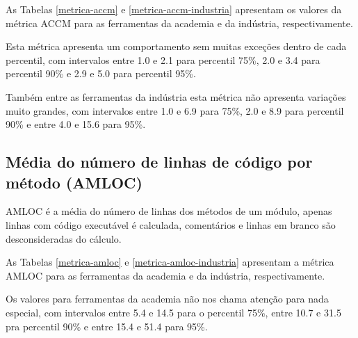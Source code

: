 As Tabelas \ref{metrica-accm} e \ref{metrica-accm-industria} apresentam os
valores da métrica ACCM para as ferramentas da academia e da indústria,
respectivamente.


Esta métrica apresenta um comportamento sem muitas exceções dentro de cada
percentil, com intervalos entre 1.0 e 2.1 para percentil 75\%, 2.0 e 3.4 para
percentil 90\% e 2.9 e 5.0 para percentil 95\%.


Também entre as ferramentas da indústria esta métrica não apresenta variações
muito grandes, com intervalos entre 1.0 e 6.9 para 75\%, 2.0 e 8.9 para
percentil 90\% e entre 4.0 e 15.6 para 95\%.

\subsection{Média do número de linhas de código por método (AMLOC)}

AMLOC é a média do número de linhas dos métodos de um módulo, apenas linhas
com código executável é calculada, comentários e linhas em branco são
desconsideradas do cálculo.

As Tabelas \ref{metrica-amloc} e \ref{metrica-amloc-industria} apresentam a
métrica AMLOC para as ferramentas da academia e da indústria, respectivamente.


Os valores para ferramentas da academia não nos chama atenção para nada
especial, com intervalos entre 5.4 e 14.5 para o percentil 75\%, entre 10.7 e
31.5 pra percentil 90\% e entre 15.4 e 51.4 para 95\%.

